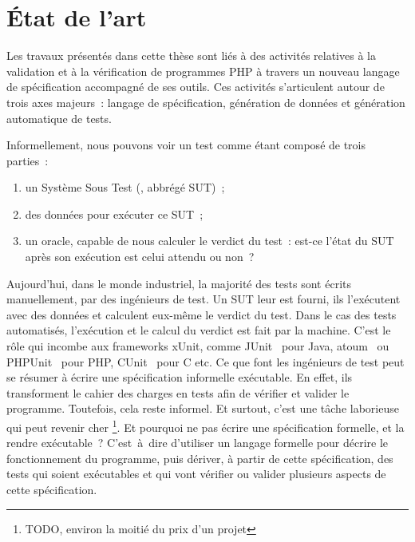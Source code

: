 \chapter{État de l'art}
\label{chapter:state}

\minitoc

Les travaux présentés dans cette thèse sont liés à des activités relatives à la
validation et à la vérification de programmes PHP à travers un nouveau langage
de spécification accompagné de ses outils. Ces activités s'articulent autour de
trois axes majeurs~: langage de spécification, génération de données et
génération automatique de tests.

Informellement, nous pouvons voir un test comme étant composé de trois parties~:

\begin{enumerate}

\item un Système Sous Test (, abbrégé SUT)~;

\item des données pour exécuter ce SUT~;

\item un oracle, capable de nous calculer le verdict du test~: est-ce l'état
du SUT après son exécution est celui attendu ou non~?

\end{enumerate}

Aujourd'hui, dans le monde industriel, la majorité des tests sont écrits
manuellement, par des ingénieurs de test. Un SUT leur est fourni, ils
l'exécutent avec des données et calculent eux-même le verdict du test. Dans le
cas des tests automatisés, l'exécution et le calcul du verdict est fait par la
machine. C'est le rôle qui incombe aux frameworks xUnit, comme
JUnit~ pour Java, atoum~ ou PHPUnit~
pour PHP, CUnit~ pour C etc. Ce que font les ingénieurs de test
peut se résumer à écrire une spécification informelle exécutable. En effet, ils
transforment le cahier des charges en tests afin de vérifier et valider le
programme. Toutefois, cela reste informel. Et surtout, c'est une tâche
laborieuse qui peut revenir cher \footnote{TODO, environ la moitié du prix d'un
projet}. Et pourquoi ne pas écrire une spécification formelle, et la rendre
exécutable~?  C'est~à~dire d'utiliser un langage formelle pour décrire le
fonctionnement du programme, puis dériver, à partir de cette spécification, des
tests qui soient exécutables et qui vont vérifier ou valider plusieurs aspects
de cette spécification.

